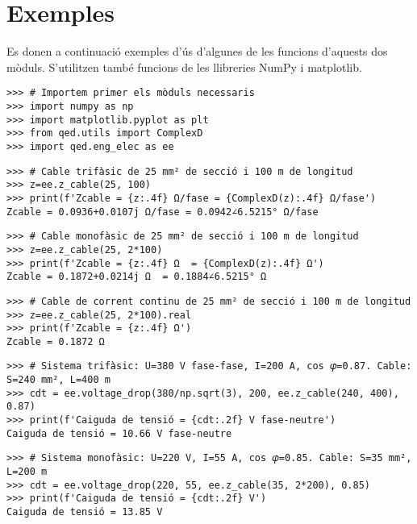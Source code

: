 


\section{Exemples}
Es donen a continuació  exemples d'ús d'algunes de les funcions d'aquests dos mòduls. S'utilitzen també funcions de les llibreries NumPy i  matplotlib.

\begin{lstlisting}
>>> # Importem primer els mòduls necessaris
>>> import numpy as np
>>> import matplotlib.pyplot as plt
>>> from qed.utils import ComplexD
>>> import qed.eng_elec as ee
\end{lstlisting} 


\begin{lstlisting}
>>> # Cable trifàsic de 25 mm² de secció i 100 m de longitud
>>> z=ee.z_cable(25, 100)
>>> print(f'Zcable = {z:.4f} Ω/fase = {ComplexD(z):.4f} Ω/fase')
Zcable = 0.0936+0.0107j Ω/fase = 0.0942∠6.5215° Ω/fase	
\end{lstlisting} 

\begin{lstlisting}
>>> # Cable monofàsic de 25 mm² de secció i 100 m de longitud
>>> z=ee.z_cable(25, 2*100)
>>> print(f'Zcable = {z:.4f} Ω  = {ComplexD(z):.4f} Ω')
Zcable = 0.1872+0.0214j Ω  = 0.1884∠6.5215° Ω	
\end{lstlisting}

\begin{lstlisting}
>>> # Cable de corrent continu de 25 mm² de secció i 100 m de longitud
>>> z=ee.z_cable(25, 2*100).real
>>> print(f'Zcable = {z:.4f} Ω')
Zcable = 0.1872 Ω	
\end{lstlisting}

\begin{lstlisting}
>>> # Sistema trifàsic: U=380 V fase-fase, I=200 A, cos 𝜑=0.87. Cable: S=240 mm², L=400 m
>>> cdt = ee.voltage_drop(380/np.sqrt(3), 200, ee.z_cable(240, 400), 0.87)
>>> print(f'Caiguda de tensió = {cdt:.2f} V fase-neutre')
Caiguda de tensió = 10.66 V fase-neutre
\end{lstlisting}

\begin{lstlisting}
>>> # Sistema monofàsic: U=220 V, I=55 A, cos 𝜑=0.85. Cable: S=35 mm², L=200 m
>>> cdt = ee.voltage_drop(220, 55, ee.z_cable(35, 2*200), 0.85)
>>> print(f'Caiguda de tensió = {cdt:.2f} V')
Caiguda de tensió = 13.85 V
\end{lstlisting}

